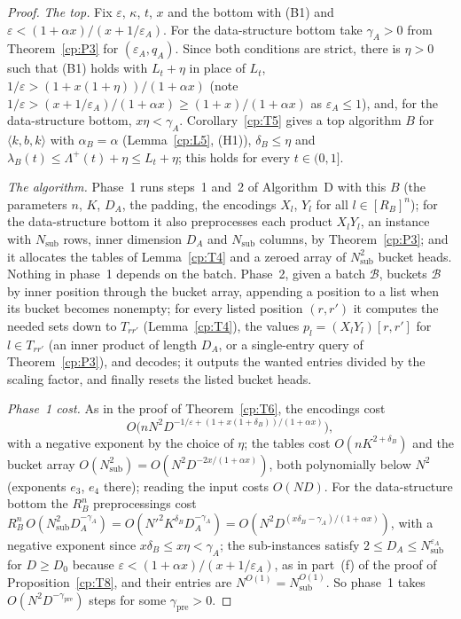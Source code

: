 \documentclass[11pt]{article}
\theoremstyle{definition}
\theoremstyle{remark}
\providecommand{\eps}{\varepsilon}
\newcommand{\mat}[3]{\langle #1,#2,#3\rangle} %
\newcommand{\lamB}{\lambda_B}                 %
\newcommand{\delB}{\delta_B}                  %
\newcommand{\alB}{\alpha_B}                   %
\newcommand{\RB}{R_B}                         %
\newcommand{\Lamp}{\Lambda^{+}}               %
\newcommand{\Hcond}[1]{\textup{(H#1)}}        %
\newcommand{\AlgD}{Algorithm~D}                             %
\newcommand{\Bt}{\mathcal B}                         %
\begin{document}
\begin{proof}
\emph{The top.} Fix $\eps$, $\kappa$, $t$, $x$ and the bottom with (B1) and $\eps<(1+\alpha x)/(x+1/\eps_A)$. For the data-structure bottom take $\gamma_A>0$ from Theorem~\ref{cp:P3} for $(\eps_A,q_A)$. Since both conditions are strict, there is $\eta>0$ such that (B1) holds with $L_t+\eta$ in place of $L_t$, $1/\eps>(1+x(1+\eta))/(1+\alpha x)$ (note $1/\eps>(x+1/\eps_A)/(1+\alpha x)\ge(1+x)/(1+\alpha x)$ as $\eps_A\le1$), and, for the data-structure bottom, $x\eta<\gamma_A$. Corollary~\ref{cp:T5} gives a top algorithm $B$ for $\mat kbk$ with $\alB=\alpha$ (Lemma~\ref{cp:L5}, \Hcond1), $\delB\le\eta$ and $\lamB(t)\le\Lamp(t)+\eta\le L_t+\eta$; this holds for every $t\in(0,1]$.

\emph{The algorithm.} Phase~1 runs steps~1 and~2 of \AlgD{} with this $B$ (the parameters $n$, $K$, $D_A$, the padding, the encodings $X_l$, $Y_l$ for all $l\in[\RB]^n$); for the data-structure bottom it also preprocesses each product $X_lY_l$, an instance with $N_{\mathrm{sub}}$ rows, inner dimension $D_A$ and $N_{\mathrm{sub}}$ columns, by Theorem~\ref{cp:P3}; and it allocates the tables of Lemma~\ref{cp:T4} and a zeroed array of $N_{\mathrm{sub}}^2$ bucket heads. Nothing in phase~1 depends on the batch. Phase~2, given a batch $\Bt$, buckets $\Bt$ by inner position through the bucket array, appending a position to a list when its bucket becomes nonempty; for every listed position $(r,r')$ it computes the needed sets down to $T_{rr'}$ (Lemma~\ref{cp:T4}), the values $p_l=(X_lY_l)[r,r']$ for $l\in T_{rr'}$ (an inner product of length $D_A$, or a single-entry query of Theorem~\ref{cp:P3}), and decodes; it outputs the wanted entries divided by the scaling factor, and finally resets the listed bucket heads.

\emph{Phase~1 cost.} As in the proof of Theorem~\ref{cp:T6}, the encodings cost
\[
O\bigl(nN^2D^{-1/\eps+(1+x(1+\delB))/(1+\alpha x)}\bigr),
\]
with a negative exponent by the choice of $\eta$; the tables cost $O(nK^{2+\delB})$ and the bucket array $O(N_{\mathrm{sub}}^2)=O(N^2D^{-2x/(1+\alpha x)})$, both polynomially below $N^2$ (exponents $e_3$, $e_4$ there); reading the input costs $O(ND)$. For the data-structure bottom the $\RB^n$ preprocessings cost $\RB^n\,O(N_{\mathrm{sub}}^2D_A^{-\gamma_A})=O(N'^2K^{\delB}D_A^{-\gamma_A})=O(N^2D^{(x\delB-\gamma_A)/(1+\alpha x)})$, with a negative exponent since $x\delB\le x\eta<\gamma_A$; the sub-instances satisfy $2\le D_A\le N_{\mathrm{sub}}^{\eps_A}$ for $D\ge D_0$ because $\eps<(1+\alpha x)/(x+1/\eps_A)$, as in part~(f) of the proof of Proposition~\ref{cp:T8}, and their entries are $N^{O(1)}=N_{\mathrm{sub}}^{O(1)}$. So phase~1 takes $O(N^2D^{-\gamma_{\mathrm{pre}}})$ steps for some $\gamma_{\mathrm{pre}}>0$.


\end{proof}
\end{document}
